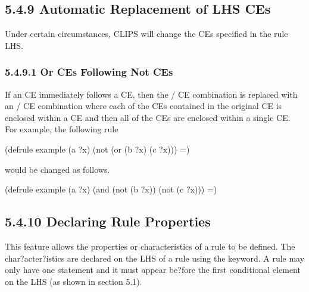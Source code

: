 \documentclass[letterpaper,10pt,english]{sphinxmanual}
\begin{document}
\subsection{5.4.9 Automatic Replacement of LHS CEs}
\label{\detokenize{defrule:automatic-replacement-of-lhs-ces}}
Under certain circumstances, CLIPS will change the CEs specified in the
rule LHS.


\subsubsection{5.4.9.1 Or CEs Following Not CEs}
\label{\detokenize{defrule:or-ces-following-not-ces}}
If an  CE immediately follows a  CE, then the / CE
combination is replaced with an / CE combination where each of
the CEs contained in the original  CE is enclosed within a  CE
and then all of the  CEs are enclosed within a single  CE. For
example, the following rule

\begin{sphinxVerbatim}[commandchars=\\\{\}]
(defrule example
  (a ?x)
  (not (or (b ?x)
  (c ?x)))
  =\PYGZgt{})
\end{sphinxVerbatim}

would be changed as follows.

\begin{sphinxVerbatim}[commandchars=\\\{\}]
(defrule example
  (a ?x)
  (and (not (b ?x))
  (not (c ?x)))
  =\PYGZgt{})
\end{sphinxVerbatim}


\subsection{5.4.10 Declaring Rule Properties}
\label{\detokenize{defrule:declaring-rule-properties}}
This feature allows the properties or characteristics of a rule to be
defined. The char?acter?istics are declared on the LHS of a rule using
the  keyword. A rule may only have one  statement
and it must appear be?fore the first conditional element on the LHS (as
shown in section 5.1).

\end{document}
